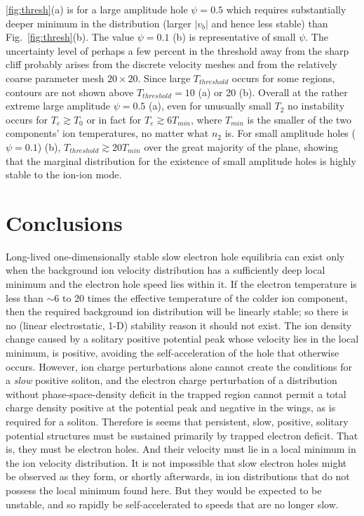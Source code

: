 \documentclass[12pt]{article}
\begin{document}
\ref{fig:thresh}(a) is for a large amplitude hole $\psi=0.5$ which
requires substantially deeper minimum in the distribution (larger
$|v_b|$ and hence less stable) than Fig.\ \ref{fig:thresh}(b). The
value $\psi=0.1$ (b) is representative of small $\psi$. The
uncertainty level of perhaps a few percent in the threshold away from
the sharp cliff probably arises from the discrete velocity meshes and
from the relatively coarse parameter mesh $20\times 20$.
Since large $T_{threshold}$ occurs for some regions, contours are not
shown above $T_{threshold}=10$ (a) or 20 (b). Overall at the rather
extreme large amplitude $\psi=0.5$ (a), even for unusually small $T_2$
no instability occurs for $T_e\gtrsim T_0$ or in fact for
$T_e\gtrsim 6 T_{min}$, where $T_{min}$ is the smaller of the two
components' ion temperatures, no matter what $n_2$ is. For small
amplitude holes ($\psi=0.1$) (b), $T_{threshold}\gtrsim 20 T_{min}$
over the great majority of the plane, showing that the marginal
distribution for the existence of small amplitude holes is highly
stable to the ion-ion mode.

\section{Conclusions}

Long-lived one-dimensionally stable slow electron hole equilibria can
exist only when the background ion velocity distribution has a
sufficiently deep local minimum and the electron hole speed lies
within it. If the electron temperature is less than $\sim 6$ to 20
times the effective temperature of the colder ion component, then the
required background ion distribution will be linearly stable; so there
is no (linear electrostatic, 1-D) stability reason it should not
exist. The ion density change caused by a solitary positive potential
peak whose velocity lies in the local minimum, is positive, avoiding
the self-acceleration of the hole that otherwise occurs. However, ion
charge perturbations alone cannot create the conditions for a
\emph{slow} positive soliton, and the electron charge perturbation of
a distribution without phase-space-density deficit in the trapped
region cannot permit a total charge density positive at the potential
peak and negative in the wings, as is required for a
soliton. Therefore is seems that persistent, slow, positive, solitary
potential structures must be sustained primarily by trapped electron
deficit. That is, they must be electron holes. And their velocity must
lie in a local minimum in the ion velocity distribution. It is not
impossible that slow electron holes might be observed as they form, or
shortly afterwards, in ion distributions that do not possess the local
minimum found here. But they would be expected to be unstable, and so
rapidly be self-accelerated to speeds that are no longer slow.
\end{document}
